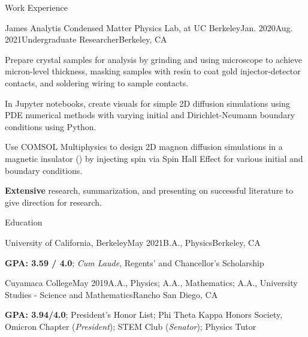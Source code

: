 \documentclass{resume}
\begin{document}
\begin{Section}{Work Experience}
\begin{workSection}{James Analytis Condensed Matter Physics Lab, at UC Berkeley}{Jan. 2020}{Aug. 2021}{Undergraduate Researcher}{Berkeley, CA}
 \item  Prepare  crystal samples for analysis by grinding and using microscope to achieve micron-level thickness, masking samples with resin to coat gold injector-detector contacts, and soldering wiring to sample contacts.
 \item In Jupyter notebooks, create visuals for simple 2D diffusion simulations using PDE numerical methods with varying initial and Dirichlet-Neumann boundary conditions using Python.
 \item Use COMSOL Multiphysics to design 2D magnon diffusion simulations in a magnetic insulator () by injecting spin via Spin Hall Effect for various initial and boundary conditions.
 \item \textbf{Extensive} research, summarization, and presenting on successful literature to give direction for research.

\end{workSection}

\end{Section}

\begin{Section}{Education}


\begin{eduSection}{University of California, Berkeley}{May 2021}{B.A., Physics}{Berkeley, CA}
\item \textbf{GPA: 3.59 / 4.0}; \textit{Cum Laude}, Regents’ and Chancellor’s Scholarship
\end{eduSection}


\begin{eduSection}{Cuyamaca College}{May 2019}{A.A., Physics; A.A., Mathematics; A.A., University Studies - Science and Mathematics}{Rancho San Diego, CA}
 \item \textbf{GPA: 3.94/4.0}; President’s Honor List; Phi Theta Kappa Honors Society, Omicron Chapter (\textit{President}); STEM Club (\textit{Senator}); Physics Tutor 
\end{eduSection}

\end{Section}

\end{document}
